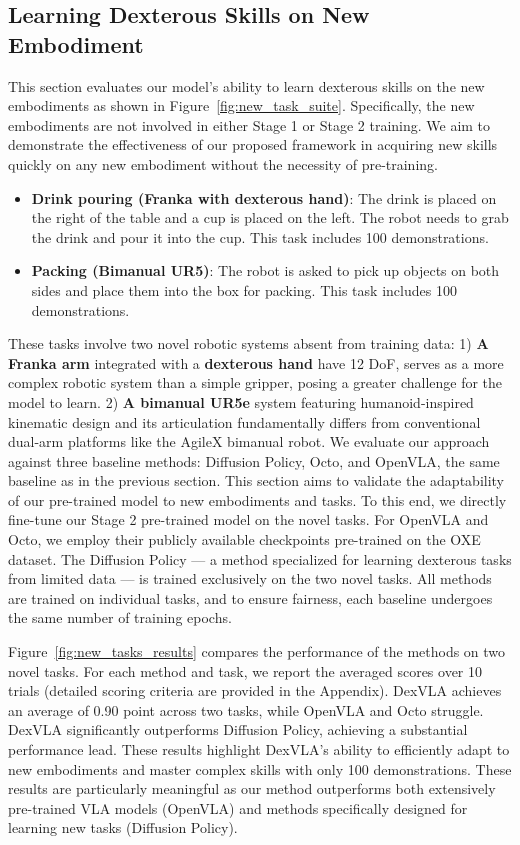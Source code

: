 \subsection{Learning Dexterous Skills on New Embodiment}
\label{sec:new_embodiment}
This section evaluates our model's ability to learn dexterous skills on the new embodiments as shown in Figure~\ref{fig:new_task_suite}. Specifically, the new embodiments are not involved in either Stage 1 or Stage 2 training. We aim to demonstrate the effectiveness of our proposed framework in acquiring new skills quickly on any new embodiment without the necessity of pre-training.
\begin{itemize}
    \item \textbf{Drink pouring (Franka with dexterous hand)}: The drink is placed on the right of the table and a cup is placed on the left. The robot needs to grab the drink and pour it into the cup. This task includes 100 demonstrations. 
    \item \textbf{Packing (Bimanual UR5)}: The robot is asked to pick up objects on both sides and place them into the box for packing. This task includes 100 demonstrations. 
\end{itemize}

These tasks involve two novel robotic systems absent from training data: 1) \textbf{A Franka arm} integrated with a \textbf{dexterous hand} have 12 DoF, serves as a more complex robotic system than a simple gripper, posing a greater challenge for the model to learn. 2) \textbf{A bimanual UR5e} system featuring humanoid-inspired kinematic design and its articulation fundamentally differs from conventional dual-arm platforms like the AgileX bimanual robot.
We evaluate our approach against three baseline methods: Diffusion Policy, Octo, and OpenVLA, the same baseline as in the previous section. This section aims to validate the adaptability of our pre-trained model to new embodiments and tasks. To this end, we directly fine-tune our Stage 2 pre-trained model on the novel tasks. For OpenVLA and Octo, we employ their publicly available checkpoints pre-trained on the OXE dataset. The Diffusion Policy — a method specialized for learning dexterous tasks from limited data — is trained exclusively on the two novel tasks. All methods are trained on individual tasks, and to ensure fairness, each baseline undergoes the same number of training epochs.

Figure~\ref{fig:new_tasks_results} compares the performance of the methods on two novel tasks. For each method and task, we report the averaged scores over 10 trials (detailed scoring criteria are provided in the Appendix). DexVLA achieves an average of 0.90 point across two tasks, while OpenVLA and Octo struggle. DexVLA significantly outperforms Diffusion Policy, achieving a substantial performance lead. These results highlight DexVLA’s ability to efficiently adapt to new embodiments and master complex skills with only 100 demonstrations.  These results are particularly meaningful as our method outperforms both extensively pre-trained VLA models (OpenVLA) and methods specifically designed for learning new tasks (Diffusion Policy).


